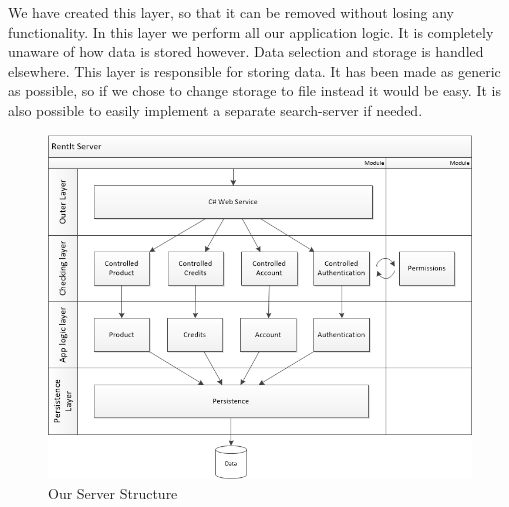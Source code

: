 We have created this layer, so that it can be removed without losing any functionality.
In this layer we perform all our application logic. It is completely unaware of how data is stored however. Data selection and storage is handled elsewhere.
This layer is responsible for storing data. It has been made as generic as possible, so if we chose to change storage to file instead it would be easy. It is also possible to easily implement a separate search-server if needed.

\begin{figure}[H]
  \includegraphics[width=\textwidth]{illustrations/ServerStructure.png}
  \caption{Our Server Structure}
  \label{fig:serverstructure}
\end{figure}
\newpage